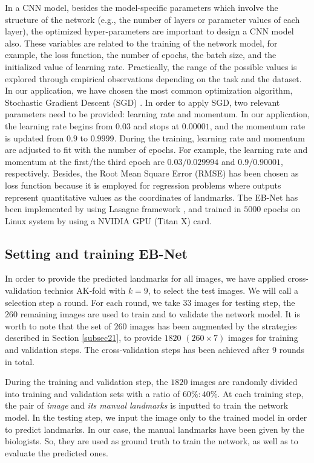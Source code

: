 \documentclass[review]{elsarticle}
\begin{document}
In a CNN model, besides the model-specific parameters which involve
the structure of the network (e.g., the number of layers or parameter
values of each layer), the optimized hyper-parameters are 
important to design a CNN model also. These variables
are related to the training of the network model, for example, the
loss function, the number of epochs, the batch size, and the
initialized value of learning rate. Practically, the range of the
possible values is explored through empirical observations depending on the task and the
dataset. In our application, we have chosen the most common
optimization algorithm, Stochastic Gradient Descent (SGD) \cite{krizhevsky2012imagenet, cintas2016automatic}. In order
to apply SGD, two relevant parameters need to be provided:
learning rate and momentum. In our application, the learning rate
begins from $0.03$ and stops at $0.00001$, and the momentum rate
is updated from $0.9$ to $0.9999$. During the training, learning rate
and momentum are adjusted to fit with the number of epochs. For
example, the learning rate and momentum at the first/the third epoch
are $0.03/ 0.029994$ and $0.9/0.90001$, respectively. Besides, the
Root Mean Square Error (RMSE) has been chosen as loss function because
it is employed for regression problems where outputs represent
quantitative values as the coordinates of landmarks. The
EB-Net has been implemented by using Lasagne framework \cite{lasagne},
and trained in $5000$ epochs on Linux system by using a NVIDIA GPU
(Titan X) card.


\subsection{Setting and training EB-Net}
\label{subsec23}
In order to provide the predicted landmarks for all images, we have
applied cross-validation technics AK-fold with $k=9$, to select the test images. We will
call a selection step a round. For each round, we take $33$ images
for testing step, the $260$ remaining images are used to train and
to validate the network model. It is worth to note that the set of
$260$ images has been augmented by the strategies described in Section
\ref{subsec21}, to provide $1820$ $(260 \times 7)$ images for training
and validation steps. The cross-validation steps has been achieved after $9$ rounds in total.


During the training and validation step, the $1820$ images are
randomly divided into training and validation sets with a ratio of
$60\%:40\%$. At each training step, the pair of \textit{image} and
\textit{its manual landmarks} is inputted to train the network
model. In the testing step, we input the image only to the trained
model in order to predict landmarks. In our case, the manual landmarks have
been given by the biologists. So, they are used as ground truth to
train the network, as well as to evaluate the predicted ones.
\end{document}
